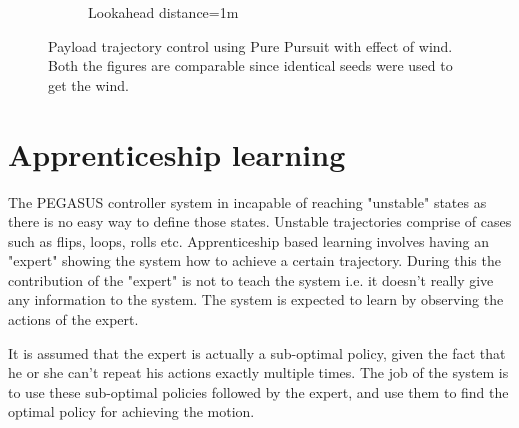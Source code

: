 \documentclass[hidelinks,BTech]{iitmdiss}
\begin{document}
\begin{figure}[H]
\begin{subfigure}[t]{0.48\textwidth}
      \caption{Lookahead distance=1m}
  \end{subfigure}
  \caption{Payload trajectory control using Pure Pursuit with effect of wind. Both the figures are comparable since identical seeds were used to get the wind.}
\end{figure}	

\chapter{Apprenticeship learning}
 The PEGASUS controller system in incapable of reaching "unstable" states as there is no easy way to define those states. Unstable trajectories comprise of cases such as flips, loops, rolls etc. Apprenticeship based learning involves having an "expert" showing the system how to achieve a certain trajectory. During this the contribution of the "expert" is not to teach the system i.e. it doesn't really give any information to the system. The system is expected to learn by observing the actions of the expert. 
 
 It is assumed that the expert is actually a sub-optimal policy, given the fact that he or she can't repeat his actions exactly multiple times. The job of the system is to use these sub-optimal policies followed by the expert, and use them to find the optimal policy for achieving the motion.
\end{document}
